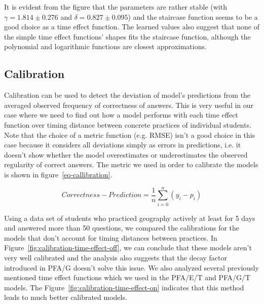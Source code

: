 It is evident from the figure that the parameters are rather stable (with $\gamma = 1.814 \pm 0.276$ and $\delta = 0.827 \pm 0.095$) and the staircase function seems to be a good choice as a time effect function. The learned values also suggest that none of the simple time effect functions' shapes fits the staircase function, although the polynomial and logarithmic functions are closest approximations.

\subsection{Calibration}
\label{memory-calibration}

Calibration can be used to detect the deviation of model's predictions from the averaged observed frequency of correctness of answers. This is very useful in our case where we need to find out how a model performs with each time effect function over timing distance between concrete practices of individual students. Note that the choice of a metric function (e.g. RMSE) isn't a good choice in this case because it considers all deviations simply as errors in predictions, i.e. it doesn't show whether the model overestimates or underestimates the observed regularity of correct answers. The metric we used in order to calibrate the models is shown in figure~\ref{eq-callibration}.

\begin{equation} \label{eq-callibration}
  \mathit{Correctness} - \mathit{Prediction} = \frac{1}{n} \sum_{i=0}^{n} (y_i - p_i)
\end{equation}

Using a data set of students who practiced geography actively at least for 5 days and answered more than 50 questions, we compared the calibrations for the models that don't account for timing distances between practices. In Figure~\ref{fig:calibration-time-effect-off}, we can conclude that these models aren't very well calibrated and the analysis also suggests that the decay factor introduced in PFA/G doesn't solve this issue. We also analyzed several previously mentioned time effect functions which we used in the PFA/E/T and PFA/G/T models. The Figure~\ref{fig:calibration-time-effect-on} indicates that this method leads to much better calibrated models.

